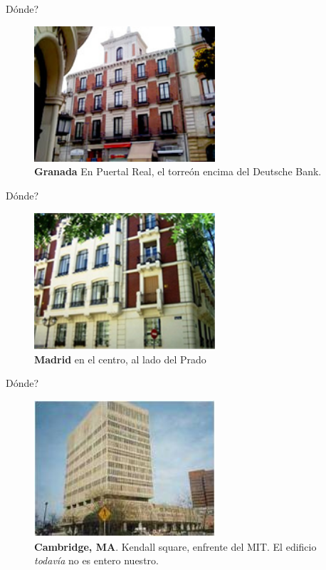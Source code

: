 \documentclass[12pt,compress]{beamer}
\begin{document}
\begin{frame}{Dónde?}

\begin{figure}[htbp]
\centering
\includegraphics[width=0.60000\textwidth]{images/granada.jpg}
\caption{\textbf{Granada} En Puertal Real, el torreón encima del
Deutsche Bank.}
\end{figure}

\end{frame}

\begin{frame}{Dónde?}

\begin{figure}[htbp]
\centering
\includegraphics[width=0.60000\textwidth]{images/madrid.png}
\caption{\textbf{Madrid} en el centro, al lado del Prado}
\end{figure}

\end{frame}

\begin{frame}{Dónde?}

\begin{figure}[htbp]
\centering
\includegraphics[width=0.60000\textwidth]{images/boston.jpg}
\caption{\textbf{Cambridge, MA}. Kendall square, enfrente del MIT. El
edificio \emph{todavía} no es entero nuestro.}
\end{figure}

\end{frame}
\end{document}
